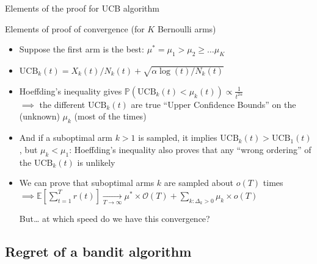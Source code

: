 \documentclass[11pt,english,ignorenonframetext,]{beamer}
\begin{document}
\begin{frame}{Elements of the proof for UCB algorithm}

  \begin{block}{Elements of proof of convergence (for $K$ Bernoulli arms)}
    \begin{itemize}[<+->]
      \item
        Suppose the first arm is the best:
        $\mu^* = \mu_1 > \mu_2 \geq \ldots \mu_K$
      \item
        $\mathrm{UCB}_k(t) = X_k(t) / N_k(t) + \sqrt{\alpha \log(t) / N_k(t)}$
      \item
        Hoeffding's inequality gives
        $\mathbb{P}(\mathrm{UCB}_k(t) < \mu_k(t)) \propto \frac{1}{t^{2 \alpha}}$\\
        $\implies$ the different $\mathrm{UCB}_k(t)$ are true ``Upper Confidence Bounds'' on the (unknown) $\mu_k$ (most of the times)
      \item
        And if a suboptimal arm $k>1$ is sampled, it implies
        $\mathrm{UCB}_k(t) > \mathrm{UCB}_1(t)$, but $\mu_k < \mu_1$:
        Hoeffding's inequality also proves that any ``wrong ordering'' of the $\mathrm{UCB}_k(t)$ is unlikely
      \item
        We can prove that suboptimal arms $k$ are sampled about $o(T)$ times\\
        $\implies \mathbb{E}\left[ \sum\limits_{t=1}^T r(t) \right] \underset{T\to\infty}{\to} \mu^* \times \mathcal{O}(T) + \sum\limits_{k: \Delta_k>0} \mu_k \times o(T)$

        \alert{But\ldots{} at which speed do we have this convergence?}
    \end{itemize}
  \end{block}

\end{frame}


\subsection{\hfill{}Regret of a bandit algorithm\hfill{}}
\end{document}
